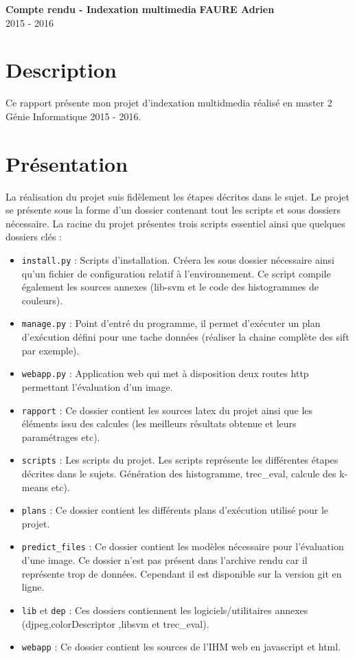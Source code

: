 \documentclass[a4paper, 11pt]{article}
\begin{document}
\noindent
\large\textbf{Compte rendu - Indexation multimedia} \hfill \textbf{FAURE Adrien} \\
2015 - 2016

\tableofcontents

\section{Description}
Ce rapport présente mon projet d'indexation multidmedia réalisé en master 2 Génie Informatique 2015 - 2016.

\section{Présentation}
La réalisation du projet suis fidèlement les étapes décrites dans le sujet.
Le projet se présente sous la forme d'un dossier contenant tout les scripts et sous dossiers nécessaire. La racine du projet présentes trois scripts essentiel ainsi que quelques dossiers clés :
\begin{itemize}
	\item \texttt{install.py} : Scripts d'installation. Créera les sous dossier nécessaire ainsi qu'un fichier de configuration relatif à l'environnement. Ce script compile également les sources annexes (lib-svm et le code des histogrammes de couleurs).
    \item \texttt{manage.py} : Point d'entré du programme, il permet d'exécuter un plan d'exécution défini pour une tache données (réaliser la chaine complète des sift par exemple).
    \item \texttt{webapp.py} : Application web qui met à disposition deux routes http permettant l'évaluation d'un image.
    \item \texttt{rapport} : Ce dossier contient les sources latex du projet ainsi que les éléments issu des calcules (les meilleurs résultats obtenue et leurs paramétrages etc).
    \item \texttt{scripts} : Les scripts du projet. Les scripts représente les différentes étapes décrites dans le sujets. Génération des histogramme, trec\_eval, calcule des k-means etc).
    \item \texttt{plans} : Ce dossier contient les différents plans d'exécution utilisé pour le projet.
    \item \texttt{predict\_files} : Ce dossier contient les modèles nécessaire pour l'évaluation d'une image. Ce dossier n'est pas présent dans l'archive rendu car il représente trop de données. Cependant il est disponible sur la version git en ligne.
    \item \texttt{lib} et \texttt{dep} : Ces dossiers contiennent les logiciels/utilitaires annexes (djpeg,colorDescriptor ,lib\-svm et trec\_eval).
	\item \texttt{webapp} : Ce dossier contient les sources de l'IHM web en javascript et html.
\end{itemize}
\end{document}
